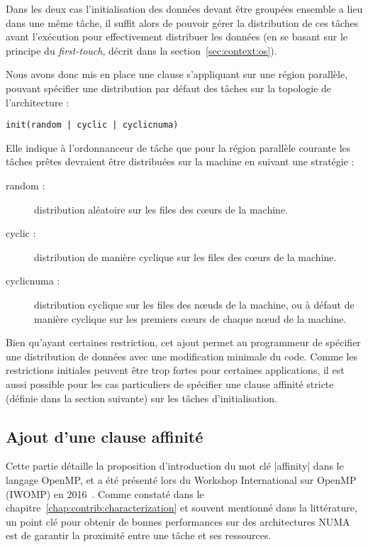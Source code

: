 Dans les deux cas l'initialisation des données devant être groupées ensemble a lieu dans une même tâche, il suffit alors de pouvoir gérer la distribution de ces tâches avant l'exécution pour effectivement distribuer les données (en se basant sur le principe du \emph{first-touch}, décrit dans la section~\ref{sec:context:os}).

Nous avons donc mis en place une clause s'appliquant sur une région parallèle, pouvant spécifier une distribution par défaut des tâches sur la topologie de l'architecture :

\begin{lstlisting}
init(random | cyclic | cyclicnuma)
\end{lstlisting}

Elle indique à l'ordonnanceur de tâche que pour la région parallèle courante les tâches prêtes devraient être distribuées sur la machine en suivant une stratégie :

\begin{description}
  \item [random :]
    distribution aléatoire sur les files des cœurs de la machine.
  \item [cyclic :]
    distribution de manière cyclique sur les files des cœurs de la machine.
  \item [cyclicnuma :]
    distribution cyclique sur les files des nœuds de la machine, ou à défaut de manière cyclique sur les premiers cœurs de chaque nœud de la machine.
\end{description}


Bien qu'ayant certaines restriction, cet ajout permet au programmeur de spécifier une distribution de données avec une modification minimale du code.
Comme les restrictions initiales peuvent être trop fortes pour certaines applications, il est aussi possible pour les cas particuliers de spécifier une clause affinité stricte (définie dans la section suivante) sur les tâches d'initialisation.

\subsection{Ajout d'une clause affinité}\label{sec:openmp:langage:affinity}

Cette partie détaille la proposition d'introduction du mot clé |affinity| dans le langage OpenMP, et a été présenté lors du Workshop International sur OpenMP (IWOMP) en 2016~\cite{Virouleau2016b}.
Comme constaté dans le chapitre~\ref{chap:contrib:characterization} et souvent mentionné dans la littérature, un point clé pour obtenir de bonnes performances sur des architectures NUMA est de garantir la proximité entre une tâche et ses ressources.

